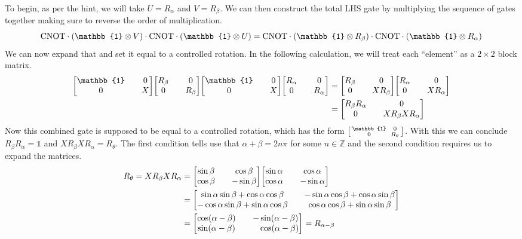 \documentclass[boxes,pages]{homework}
\begin{document}
\begin{solution}
	To begin, as per the hint, we will take $U = R_\alpha$ and $V = R_\beta$. We can then construct the total LHS gate by multiplying the sequence of gates together making sure to reverse the order of multiplication.
	\begin{equation*}
		\mathrm{CNOT}\cdot\qty(\mathbb{1}\otimes V)\cdot\mathrm{CNOT}\cdot\qty(\mathbb{1}\otimes U) = \mathrm{CNOT}\cdot\qty(\mathbb{1}\otimes R_\beta)\cdot\mathrm{CNOT}\cdot\qty(\mathbb{1}\otimes R_\alpha)
	\end{equation*}
	We can now expand that and set it equal to a controlled rotation. In the following calculation, we will treat each ``element'' as a $2\times 2$ block matrix.
	\begin{align*}
		\mqty[\mathbb{1} && 0 \\ 0 && X]\mqty[R_\beta && 0 \\ 0 && R_\beta]\mqty[\mathbb{1} && 0 \\ 0 && X]\mqty[R_\alpha && 0 \\ 0 && R_\alpha] &= \mqty[R_\beta && 0 \\ 0 && XR_\beta]\mqty[R_\alpha && 0 \\ 0 && XR_\alpha] \\
		&= \mqty[R_\beta R_\alpha && 0 \\ 0 && XR_\beta X R_\alpha]
	\end{align*}
	Now this combined gate is supposed to be equal to a controlled rotation, which has the form $\smqty[\mathbb{1} && 0 \\ 0 && R_\theta]$. With this we can conclude $R_\beta R_\alpha = \mathbb{1}$ and $XR_\beta X R_\alpha = R_\theta$. The first condition tells use that $\alpha + \beta = 2n\pi$ for some $n\in\mathbb{Z}$ and the second condition requires us to expand the matrices.
	\begin{align*}
		R_\theta = XR_\beta X R_\alpha &= \mqty[\sin\beta && \cos\beta \\ \cos\beta && -\sin\beta]\mqty[\sin\alpha && \cos\alpha \\ \cos\alpha && -\sin\alpha] \\
		&= \mqty[\sin\alpha\sin\beta + \cos\alpha\cos\beta && -\sin\alpha\cos\beta + \cos\alpha\sin\beta \\ -\cos\alpha\sin\beta + \sin\alpha\cos\beta && \cos\alpha\cos\beta + \sin\alpha\sin\beta] \\
		&= \mqty[\cos(\alpha - \beta) && -\sin(\alpha - \beta) \\ \sin(\alpha - \beta) && \phantom{-}\cos(\alpha - \beta)] = R_{\alpha - \beta}

\end{align*}
\end{solution}
\end{document}
